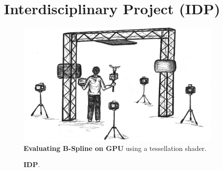 \documentclass[]{report}
\begin{document}
\section{Interdisciplinary Project (IDP)}

\begin{figure}[!ht]
	\centering
	\includegraphics[width=0.90\textwidth]{./figs/idp_overview.png}
	\caption[B-Spline GPU Tessellation]{\textbf{Evaluating B-Spline on GPU} using a tessellation shader.}
	\label{fig:bspline}
\end{figure}

\begin{figure}[!ht]
	\hfill
	\hfill
	\hfill
	\caption[Factory ray-tracing]{\textbf{IDP}.}
	\label{fig:embreeFactory}
\end{figure}
 
\end{document}

